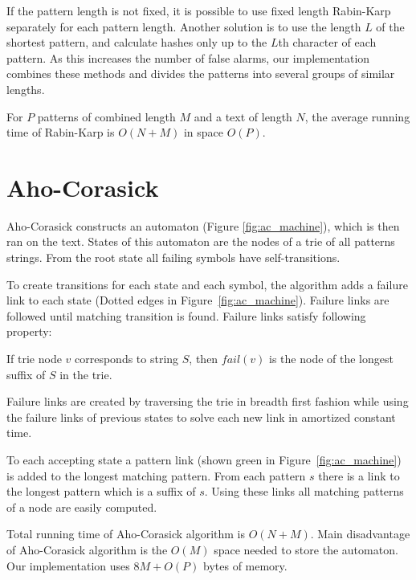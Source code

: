 \documentclass[final]{beamer}
\begin{document}
\begin{poster}
If the pattern length is not fixed, it is possible to use fixed length Rabin-Karp separately for each pattern length. Another solution is to use the length $L$ of the shortest pattern, and calculate hashes only up to the $L$th character of each pattern. As this increases the number of false alarms, our implementation combines these methods and divides the patterns into several groups of similar lengths.

For $P$ patterns of combined length $M$  and a text of length $N$, the average running time of Rabin-Karp is $O(N+M)$ in space $O(P)$.


\newcolumn
\section{Aho-Corasick}

Aho-Corasick constructs an automaton (Figure \ref{fig:ac_machine}), which is then ran on the text.
States of this automaton are the nodes of a trie of all patterns strings.
From the root state all failing symbols have self-transitions.

To create transitions for each state and each symbol, the algorithm adds a failure link to each state
(Dotted edges in Figure~\ref{fig:ac_machine}).
Failure links are followed until matching transition is found.
Failure links satisfy following property:

\begin{mdframed}
If trie node $v$ corresponds to string $S$, then
$fail(v)$ is the node of the longest suffix of $S$ in the trie.
\end{mdframed}

Failure links are created by traversing the trie in breadth first fashion
while using the failure links of previous states to solve each new
link in amortized constant time.

To each accepting state a pattern link (shown green in Figure~\ref{fig:ac_machine})
is added to the longest matching pattern.
From each pattern $s$ there is a link to the longest pattern which
is a suffix of $s$.
Using these links all matching patterns of a node are easily
computed.

Total running time of Aho-Corasick algorithm is $O(N+M)$.
Main disadvantage of Aho-Corasick algorithm is the $O(M)$ space needed to store the automaton.
Our implementation uses $8M+O(P)$ bytes of memory.

%


\end{poster}
\end{document}
